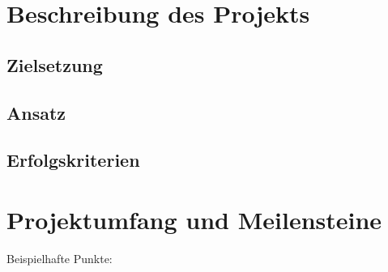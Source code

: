 \documentclass[lang=ngerman,inputenc=utf8,fontsize=10pt]{ldvarticle}
\begin{document}
\section{Beschreibung des Projekts}

\subsection*{Zielsetzung}


\subsection*{Ansatz}

\subsection*{Erfolgskriterien}

\section{Projektumfang und Meilensteine}

Beispielhafte Punkte:
\end{document}
